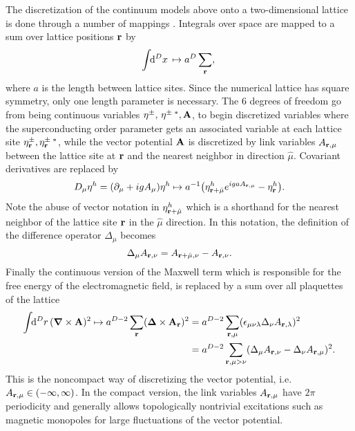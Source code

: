 The discretization of the continuum models above onto a two-dimensional lattice is done through a number of mappings \cite{troels14,peder16,shimizu12}. Integrals over space are mapped to a sum over lattice positions ${\boldsymbol{\mathbf{r}}}$ by
\begin{equation}
  \int\!\!\mathrm{d}^Dx\, \mapsto a^D\sum_{\boldsymbol{\mathbf{r}}},\\
  \label{eq:disc:map:int}
\end{equation}
where $a$ is the length between lattice sites. Since the numerical lattice has square symmetry, only one length parameter is necessary. The $6$ degrees of freedom go from being continuous variables
$\eta^\pm,\,\eta^{\pm\;\ast}, {\boldsymbol{\mathbf{A}}}$, to begin discretized variables where the superconducting order parameter gets an associated variable at each lattice site $\eta^\pm_{{\boldsymbol{\mathbf{r}}}}, \eta^{\pm\;\ast}_{\boldsymbol{\mathbf{r}}}$,
while the vector potential ${\boldsymbol{\mathbf{A}}}$ is discretized by link variables $A_{{\boldsymbol{\mathbf{r}}},\mu}$ between the lattice site at ${\boldsymbol{\mathbf{r}}}$ and the nearest neighbor in direction $\hat{\mu}$. Covariant derivatives are replaced by
\begin{equation}
  D_\mu\eta^h = (\partial_\mu + igA_\mu)\eta^h \mapsto a^{-1}\big(\eta^h_{{\boldsymbol{\mathbf{r}}}+\hat{\mu}}e^{igaA_{{\boldsymbol{\mathbf{r}}},\mu}}-\eta^h_{\boldsymbol{\mathbf{r}}}\big).
  \label{eq:disc:map:covarDer}
\end{equation}
Note the abuse of vector notation in $\eta^h_{{\boldsymbol{\mathbf{r}}}+\hat{\mu}}$ which is a shorthand for the nearest neighbor of the lattice site ${\boldsymbol{\mathbf{r}}}$ in the $\hat{\mu}$ direction. In this notation, the definition
of the difference operator $\Delta_\mu$ becomes
\begin{equation}
  \Delta_\mu A_{{\boldsymbol{\mathbf{r}}},\nu} = A_{{\boldsymbol{\mathbf{r}}}+\hat{\mu},\nu} - A_{{\boldsymbol{\mathbf{r}}},\nu}.
  \label{eq:disc:difference}
\end{equation}
Finally the continuous version of the Maxwell term which is responsible for the free energy of the electromagnetic field, is replaced by a sum over all plaquettes of the lattice
\begin{equation}
  \begin{split}
	\int\!\!\mathrm{d}^Dr\,({\boldsymbol{\mathbf{\nabla}}}\times{\ensuremath{\boldsymbol{\mathbf{A}}}})^2 \mapsto a^{D-2}\sum_{\boldsymbol{\mathbf{r}}}({\boldsymbol{\mathbf{\Delta}}}\times{\ensuremath{\boldsymbol{\mathbf{A}}}}_{\boldsymbol{\mathbf{r}}})^2 &= a^{D-2}\sum_{{\boldsymbol{\mathbf{r}}},\mu}(\epsilon_{\mu\nu\lambda}\Delta_\nu A_{{\boldsymbol{\mathbf{r}}},\lambda})^2 \\
	&= a^{D-2}\sum_{{\boldsymbol{\mathbf{r}}},\mu>\nu}(\Delta_\mu A_{{\boldsymbol{\mathbf{r}}},\nu} - \Delta_\nu A_{{\boldsymbol{\mathbf{r}}},\mu})^2.
  \end{split}
  \label{eq:disc:Maxwell:noncompact}
\end{equation}
This is the noncompact way of discretizing the vector potential, i.e. $A_{{\boldsymbol{\mathbf{r}}},\mu}\in(-\infty,\infty)$. In the compact version, the link variables $A_{{\boldsymbol{\mathbf{r}}},\mu}$ have $2\pi$ periodicity and generally
allows topologically nontrivial excitations such as magnetic monopoles \cite{shimizu12} for large fluctuations of the vector potential.

